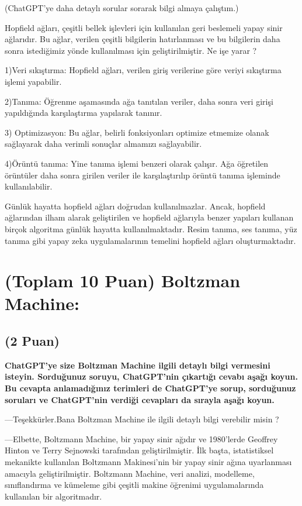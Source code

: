 \documentclass[11pt]{article}
\begin{document}
(ChatGPT'ye daha detaylı sorular sorarak bilgi almaya çalıştım.)

    Hopfield ağları, çeşitli bellek işlevleri için kullanılan geri beslemeli yapay sinir ağlarıdır. Bu ağlar, verilen çeşitli bilgilerin hatırlanması ve bu bilgilerin daha sonra istediğimiz yönde kullanılması için geliştirilmiştir. Ne işe yarar ?

1)Veri sıkıştırma: Hopfield ağları, verilen giriş verilerine göre veriyi sıkıştırma işlemi yapabilir. 

2)Tanıma: Öğrenme aşamasında ağa tanıtılan veriler, daha sonra veri girişi yapıldığında karşılaştırma yapılarak tanınır.

3) Optimizasyon: Bu ağlar, belirli fonksiyonları optimize etmemize olanak sağlayarak daha verimli sonuçlar almamızı sağlayabilir.

4)Örüntü tanıma: Yine tanıma işlemi benzeri olarak çalışır. Ağa öğretilen örüntüler daha sonra girilen veriler ile karşılaştırılıp örüntü tanıma işleminde kullanılabilir. 

Günlük hayatta hopfield ağları doğrudan kullanılmazlar. Ancak, hopfield ağlarından ilham alarak geliştirilen ve hopfield ağlarıyla benzer yapıları kullanan birçok algoritma günlük hayatta kullanılmaktadır. Resim tanıma, ses tanıma, yüz tanıma gibi yapay zeka uygulamalarının temelini hopfield ağları oluşturmaktadır.
\newpage

\section{(Toplam 10 Puan) Boltzman Machine:}

\subsection{(2 Puan)} \textbf{ChatGPT’ye size Boltzman Machine ilgili detaylı bilgi vermesini isteyin. Sorduğunuz soruyu, ChatGPT'nin çıkartığı cevabı aşağı koyun. Bu cevapta anlamadığınız terimleri de ChatGPT’ye sorup, sorduğunuz soruları ve ChatGPT’nin verdiği cevapları da sırayla aşağı koyun.}

---Teşekkürler.Bana Boltzman Machine ile ilgili detaylı bilgi verebilir misin ?

---Elbette, Boltzmann Machine, bir yapay sinir ağıdır ve 1980'lerde Geoffrey Hinton ve Terry Sejnowski tarafından geliştirilmiştir. İlk başta, istatistiksel mekanikte kullanılan Boltzmann Makinesi'nin bir yapay sinir ağına uyarlanması amacıyla geliştirilmiştir. Boltzmann Machine, veri analizi, modelleme, sınıflandırma ve kümeleme gibi çeşitli makine öğrenimi uygulamalarında kullanılan bir algoritmadır.
\end{document}
